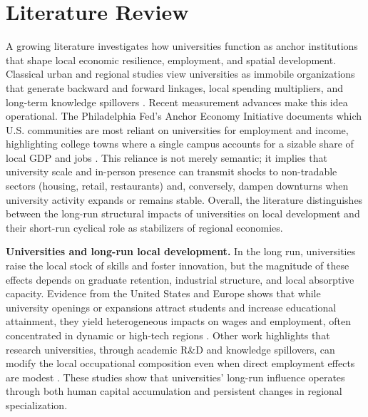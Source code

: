 
\section{ Literature Review}

\noindent A growing literature investigates how universities function as anchor institutions that shape local economic resilience, employment, and spatial development. Classical urban and regional studies view universities as immobile organizations that generate backward and forward linkages, local spending multipliers, and long-term knowledge spillovers \citep{Saxenian1996RegionalAdvantage,felsensteinUniversityMetropolitanArena1996}. Recent measurement advances make this idea operational. The Philadelphia Fed’s Anchor Economy Initiative documents which U.S. communities are most reliant on universities for employment and income, highlighting college towns where a single campus accounts for a sizable share of local GDP and jobs \citep{Harker2024AnchorReliance}. This reliance is not merely semantic; it implies that university scale and in-person presence can transmit shocks to non-tradable sectors (housing, retail, restaurants) and, conversely, dampen downturns when university activity expands or remains stable. Overall, the literature distinguishes between the long-run structural impacts of universities on local development and their short-run cyclical role as stabilizers of regional economies.

\noindent \textbf{Universities and long-run local development.} In the long run, universities raise the local stock of skills and foster innovation, but the magnitude of these effects depends on graduate retention, industrial structure, and local absorptive capacity. Evidence from the United States and Europe shows that while university openings or expansions attract students and increase educational attainment, they yield heterogeneous impacts on wages and employment, often concentrated in dynamic or high-tech regions \citep{berlingieriCollegeOpeningsLocal2022,ferhatImpactUniversityOpenings,amendolaDoesGraduateHuman2020,abelCollegesUniversitiesIncrease2012}. Other work highlights that research universities, through academic R\&D and knowledge spillovers, can modify the local occupational composition even when direct employment effects are modest \citep{beesonEffectsCollegesUniversities,harrisUniversitiesAnchorInstitutions2016}. These studies show that universities’ long-run influence operates through both human capital accumulation and persistent changes in regional specialization.

